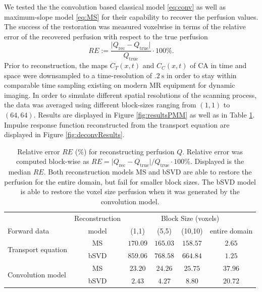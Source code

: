 \documentclass[paper=a4, fontsize=11pt,parskip=half,headings=small]{scrartcl}
\newcommand{\Perf}{Q}
\begin{document}
	We tested the the convolution based classical model \eqref{eq:conv} as well as maximum-slope model \eqref{eq:MS} for their capability to recover the perfusion values.
	The success of the restoration was measured voxelwise in terms of the relative error of the recovered perfusion with respect to the true perfusion
	\begin{equation}
		RE := \frac{\vert \Perf_{\mathrm{rec}} - \Perf_{\mathrm{true}}\vert}{\Perf_{\mathrm{true}}}\cdot 100\%.
	\end{equation}
	Prior to reconstruction, the maps $C_T(x,t)$ and $C_C(x,t)$ of CA in time and space were downsampled to a time-resolution of $\SI{.2}{\second}$ in order to stay within comparable time sampling existing on modern MR equipment for dynamic imaging.
	In order to simulate different spatial resolutions of the scanning process, the data was averaged using different block-sizes ranging from $(1,1)$ to $(64,64)$.
	Results are displayed in Figure \ref{fig:resultsPMM} as well as in Table \ref{tab:resultsSim}.
	Impulse response function reconstructed from the transport equation are displayed in Figure \ref{fig:deconvResults}.	
	
	\begin{table}[H]
		\caption{Relative error $RE$ (\%) for reconstructing perfusion $\Perf$. Relative error was computed block-wise as $RE = \vert \Perf_{\mathrm{rec}} - \Perf_{\mathrm{true}}\vert / \Perf_{\mathrm{true}}\cdot 100\%$. Displayed is the median $RE$. Both reconstruction models MS and bSVD are able to restore the perfusion for the entire domain, but fail for smaller block sizes. The bSVD model is able to restore the voxel size perfusion when it was generated by the convolution model. }
		\centering
		\begin{tabular}{l c c c c c }
			 & Reconstruction & \multicolumn{4}{c}{Block Size (voxels)}\\
			Forward data 		& model		& (1,1) 	& (5,5)		& (10,10)	& entire domain \\
			\toprule
			\multirow{2}{*}{Transport equation} & MS 	& $170.09$ 	& $165.03$ 	& $158.57$	& $2.65$ \\
			 					 	   		& bSVD  & $859.06$ 	& $768.58$ 	& $664.84$	& $1.25$ \\
			\multirow{2}{*}{Convolution model} & MS 	& $23.20$ 	& $24.26$ 	& $25.75$ 	& $37.96$ \\
			 					 			& bSVD  & $2.43$ 	& $4.27$ 	& $8.80$ 	& $20.72$ \\
		\end{tabular}
		\label{tab:resultsSim}
	\end{table}
\end{document}
